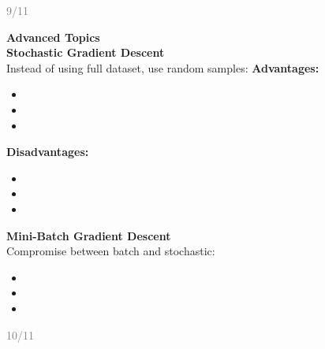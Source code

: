 \documentclass[11pt]{article}
\begin{document}
\vfill
\begin{flushright}
\textcolor{gray}{\small 9/11}
\end{flushright}

\newpage

\textbf{\huge Advanced Topics}\\[0.5cm]
\textbf{\Large Stochastic Gradient Descent}\\[0.3cm]
Instead of using full dataset, use random samples:
\textbf{Advantages:}
\begin{itemize}
\item \1
\item \1
\item \1
\end{itemize}
\textbf{Disadvantages:}
\begin{itemize}
\item \1
\item \1
\item \1
\end{itemize}
\textbf{\Large Mini-Batch Gradient Descent}\\[0.3cm]
Compromise between batch and stochastic:
\begin{itemize}
\item \1
\item \1
\item \1
\end{itemize}

\vfill
\begin{flushright}
\textcolor{gray}{\small 10/11}
\end{flushright}

\newpage
\end{document}
